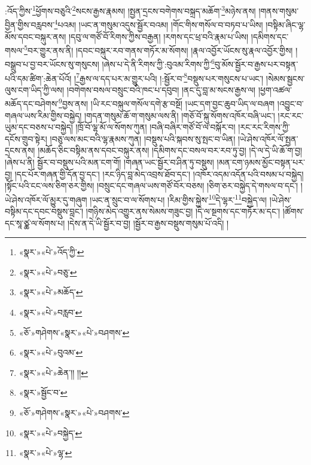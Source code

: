 :འོད་ཀྱིས་\footnote{«སྣར་»«པེ་»འོད་ཀྱི་}ཕྱོགས་བཅུའི་\footnote{«སྣར་»«པེ་»བཅུ་}སངས་རྒྱས་རྣམས། །སྤྱན་དྲངས་བགེགས་བསྐྲད་མཆོག་\footnote{«སྣར་»«པེ་»མཆོད་}མཉེས་ནས། །གནས་གསུམ་བྱིན་གྱིས་བརླབས་\footnote{«སྣར་»«པེ་»བརླབ་}པའམ། །ཡང་ན་གསུམ་འདུས་སྦྱོར་བའམ། །གོང་གིས་གསོལ་བ་བཏབ་པ་ཡིས། །བསྟིམ་ཞིང་ལྷ་མོས་དབང་བསྐུར་ནས། །དབུ་ལ་གཙོ་བོ་རིགས་ཀྱིས་བརྒྱན། །རགས་དང་ཕྲ་བའི་རྣམ་པ་ཡིས། །དམིགས་དང་གསལ་\footnote{«ཅོ་»གཤེགས་«སྣར་»«པེ་»བཤགས་}བར་གྱུར་ནས་ནི། །དབང་བསྐུར་རབ་གནས་གཏོར་མ་སོགས། །རྣལ་འབྱོར་ཡོངས་སུ་རྣལ་འབྱོར་གྱིས། །བསྒྲུབ་པ་བྱ་བར་ཡོངས་སུ་གསུངས། །ཞེས་པ་དེ་ནི་རིགས་ཀྱི་:བུའམ་རིགས་ཀྱི་\footnote{«སྣར་»«པེ་»བུའམ་}བུ་མོས་སྦྱོར་བ་རྒྱས་པར་བསྟན་པའི་དམ་ཚིག་:ཆེན་པོའོ། །\footnote{«སྣར་»«པེ་»ཆེན་།། །།}རྒྱས་ལ་དད་པར་མ་གྱུར་པའི། །:སྦྱོར་བ་\footnote{«སྣར་»སྦྱོང་བ་}བསྡུས་པར་གསུངས་པ་ཡང་། །སེམས་སྦྱངས་ལུས་ངག་ཡིད་ཀྱི་ལས། །བགེགས་བསལ་བསྲུང་བའི་ཁང་པ་དབུབ། །ནང་དུ་བླ་མ་སངས་རྒྱས་ལ། །ཕྱག་འཚལ་མཆོད་དང་བཤེགས་\footnote{«ཅོ་»གཤེགས་«སྣར་»«པེ་»བཤགས་}བྱས་ནས། །ཡི་རང་བསྐུལ་གསོལ་དགེ་རྩ་བསྔོ། །ཡང་དག་བྱང་ཆུབ་ཡིད་ལ་བཞག །འབྱུང་བ་གཞལ་ཡས་རིམ་གྱིས་བསྐྱེད། །གདན་གསུམ་ཆོ་ག་གསུམ་ལས་ནི། །གཅོ་བོ་སྐུ་སོགས་འཁོར་བཞི་ཡང་། །རང་རང་ཡུམ་དང་བཅས་པ་བསྐྱེད། །ཁྲོ་བོ་ལྷ་མོ་ལ་སོགས་ཀུན། །བཞི་བཞིར་གཙོ་བོ་ལ་བསྐོར་བ། །རང་རང་རིགས་ཀྱི་དངོས་གྲུབ་སྟེར། །བཅུ་ལས་མང་བའི་ལྷ་རྣམས་ཀུན། །བསྡུས་པའི་སྐབས་སུ་སྤང་བ་ཡིན། །ཡེ་ཤེས་འཁོར་ལོ་སྤྱན་དྲངས་ནས། །མཆོད་ཅིང་བསྟིམ་ནས་དབང་བསྐུར་ནས། །དམིགས་དང་བསལ་བར་རབ་ཏུ་བྱ། །དེ་ལ་དེ་ཡི་ཆོ་ག་བྱ། །ཞེས་པ་ནི། སྦྱོར་བ་བསྡུས་པའི་མན་ངག་གོ། །གཞན་ཡང་སྦྱོར་བ་ཤིན་ཏུ་བསྡུས། །མན་ངག་ཉམས་མྱོང་བསྟན་པར་བྱ། །དང་པོར་གཞན་གྱི་དོན་བྱ་དང་། །རང་ཉིད་བླ་མེད་འབྲས་ཐོབ་དང་། །འཁོར་འདམ་འདོན་པའི་བསམ་པ་བསྐྱེད། །སྟོང་པའི་ངང་ལས་ཅིག་ཅར་གྱིས། །བསྲུང་དང་གཞལ་ཡས་གཙོ་བོར་བཅས། །ཅིག་ཅར་བསྐྱེད་དེ་གསལ་བ་དང་། །ཡེ་ཤེས་འཁོར་ལོ་མྱུར་དུ་གཞུག །ཡང་ན་སྲུང་བ་ལ་སོགས་པ། །རིམ་གྱིས་སྐྱེས་\footnote{«སྣར་»«པེ་»བསྐྱེད་}དེ་ལྷར་\footnote{«སྣར་»«པེ་»ལྷ་}བསྐྱེད་ལ། །ཡེ་ཤེས་བསྟིམ་དང་དབང་བསྡུས་བླང་། །གཉིས་མེད་འགྱུར་ནས་སེམས་གཟུང་བྱ། །དེ་ལ་སྔགས་དང་གཏོར་མ་དང་། །ཚོགས་དང་སཱ་ཙྪ་ལ་སོགས་པ། །དེས་ན་དེ་ཡི་སྦྱོར་བ་བྱ། །སྦྱོར་བ་རྒྱས་བསྡུས་གསུམ་པོ་འདི། །
